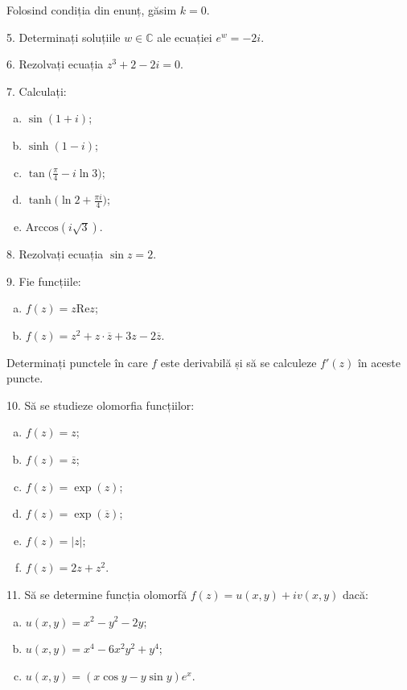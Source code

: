 \documentclass[11pt,a4paper]{article}
\newcommand\CC{\mathbb{C}}
\theoremstyle{dotless}
\theoremstyle{dotlessdr}
\begin{document}
Folosind condiția din enunț, găsim $ k = 0 $.

\vspace{1cm}

5. Determinați soluțiile $ w \in \CC $ ale ecuației $ e^w = -2i $.

\vspace{1cm}

6. Rezolvați ecuația $ z^3 + 2 - 2i = 0 $.

\vspace{1cm}

7. Calculați:
\begin{enumerate}[(a)]
\item $ \sin(1 + i) $;
\item $ \sinh(1 - i) $;
\item $ \tan\big( \frac{\pi}{4} - i\ln 3 \big) $;
\item $ \tanh \big(\ln 2 + \frac{\pi i}{4}\big) $;
\item $ \mathrm{Arccos}(i \sqrt{3}) $.
\end{enumerate}

\vspace{1cm}

8. Rezolvați ecuația $ \sin z = 2 $.

\newpage

9. Fie funcțiile:
\begin{enumerate}[(a)]
\item $ f(z) = z \mathrm{Re}z $;
\item $ f(z) = z^2 + z \cdot \overline{z} + 3z - 2\overline{z} $.
\end{enumerate}

Determinați punctele în care $ f $ este derivabilă și să se calculeze $ f'(z) $
în aceste puncte.

\vspace{1cm}

10. Să se studieze olomorfia funcțiilor:
\begin{enumerate}[(a)]
\item $ f(z) = z $;
\item $ f(z) = \overline{z} $;
\item $ f(z) = \exp(z) $;
\item $ f(z) = \exp(\overline{z}) $;
\item $ f(z) = |z| $;
\item $ f(z) = 2z + z^2 $.
\end{enumerate}

\vspace{1cm}

11. Să se determine funcția olomorfă $ f(z) = u(x, y) + iv(x, y) $ dacă:
\begin{enumerate}[(a)]
\item $ u(x, y) = x^2 - y^2 - 2y $;
\item $ u(x, y) = x^4 - 6x^2 y^2 + y^4 $;
\item $ u(x, y) = (x \cos y - y\sin y)e^x $.
\end{enumerate}
\end{document}
